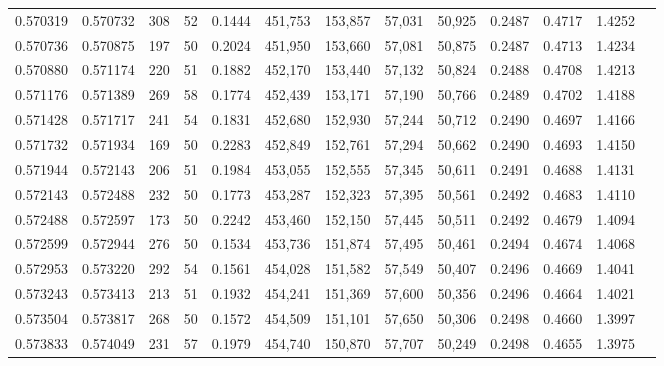 \begin{tabular}{rrrrrrrrrrrrr}
0.570319 & 0.570732 &    308 &    52 &                                     0.1444 & 451,753 & 153,857 &  57,031 &  50,925 & 0.2487 & 0.4717 & 1.4252 \\
0.570736 & 0.570875 &    197 &    50 &                                     0.2024 & 451,950 & 153,660 &  57,081 &  50,875 & 0.2487 & 0.4713 & 1.4234 \\
0.570880 & 0.571174 &    220 &    51 &                                     0.1882 & 452,170 & 153,440 &  57,132 &  50,824 & 0.2488 & 0.4708 & 1.4213 \\
0.571176 & 0.571389 &    269 &    58 &                                     0.1774 & 452,439 & 153,171 &  57,190 &  50,766 & 0.2489 & 0.4702 & 1.4188 \\
0.571428 & 0.571717 &    241 &    54 &                                     0.1831 & 452,680 & 152,930 &  57,244 &  50,712 & 0.2490 & 0.4697 & 1.4166 \\
0.571732 & 0.571934 &    169 &    50 &                                     0.2283 & 452,849 & 152,761 &  57,294 &  50,662 & 0.2490 & 0.4693 & 1.4150 \\
0.571944 & 0.572143 &    206 &    51 &                                     0.1984 & 453,055 & 152,555 &  57,345 &  50,611 & 0.2491 & 0.4688 & 1.4131 \\
0.572143 & 0.572488 &    232 &    50 &                                     0.1773 & 453,287 & 152,323 &  57,395 &  50,561 & 0.2492 & 0.4683 & 1.4110 \\
0.572488 & 0.572597 &    173 &    50 &                                     0.2242 & 453,460 & 152,150 &  57,445 &  50,511 & 0.2492 & 0.4679 & 1.4094 \\
0.572599 & 0.572944 &    276 &    50 &                                     0.1534 & 453,736 & 151,874 &  57,495 &  50,461 & 0.2494 & 0.4674 & 1.4068 \\
0.572953 & 0.573220 &    292 &    54 &                                     0.1561 & 454,028 & 151,582 &  57,549 &  50,407 & 0.2496 & 0.4669 & 1.4041 \\
0.573243 & 0.573413 &    213 &    51 &                                     0.1932 & 454,241 & 151,369 &  57,600 &  50,356 & 0.2496 & 0.4664 & 1.4021 \\
0.573504 & 0.573817 &    268 &    50 &                                     0.1572 & 454,509 & 151,101 &  57,650 &  50,306 & 0.2498 & 0.4660 & 1.3997 \\
0.573833 & 0.574049 &    231 &    57 &                                     0.1979 & 454,740 & 150,870 &  57,707 &  50,249 & 0.2498 & 0.4655 & 1.3975 \\

\end{tabular}

